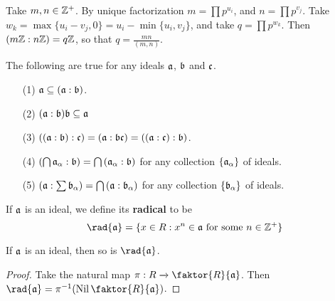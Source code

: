 \begin{example}\label{example_5.20}
  Take $m,n \in \Z^+$. By unique factorization $m=\prod{p^{u_i}}$, and
  $n=\prod{p^{v_j}}$. Take $w_k=\max{\{u_i-v_j,0\}}=u_i-\min{\{u_i,v_j\}}$, and
  take $q=\prod{p^{w_k}}$. Then $(m\Z:n\Z)=q\Z$, so that $q=\frac{mn}{(m,n)}$.
\end{example}

\begin{proposition}\label{proposition_5.5.12}
  The following are true for any ideals $\af$,  $\bf$ and  $\cf$.
  \begin{enumerate}
    \item[(1)] $\af \subseteq (\af:\bf)$.

    \item[(2)] $(\af:\bf)\bf \subseteq \af$

    \item[(3)] $((\af:\bf):\cf)=(\af:\bf\cf)=((\af:\cf):\bf)$.

    \item[(4)] $(\bigcap{\af_\a}:\bf)=\bigcap{(\af_\a:\bf)}$ for any collection
      $\{\af_\a\}$ of ideals.

    \item[(5)] $(\af:\sum{\bf_\a})=\bigcap{(\af:\bf_\a)}$ for any collection
      $\{\bf_\a\}$ of ideals.
  \end{enumerate}
\end{proposition}

\begin{definition}
  If $\af$ is an ideal, we define its \textbf{radical} to be
  \begin{equation*}
    \rad{\af}=\{x \in R : x^n \in \af \text{ for some } n \in \Z^+\}
  \end{equation*}
\end{definition}

\begin{proposition}\label{proposition_5.5.13}
  If $\af$ is an ideal, then so is $\rad{\af}$.
\end{proposition}
\begin{proof}
  Take the natural map $\pi:R \xrightarrow{} \faktor{R}{\af}$. Then
  $\rad{\af}=\inv{\pi}(\Nil{\faktor{R}{\af}})$.
\end{proof}

